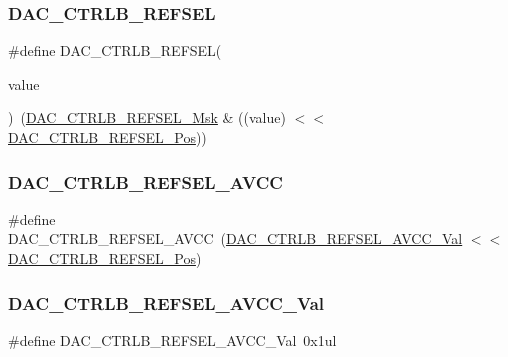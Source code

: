 \subsubsection{\texorpdfstring{DAC\_CTRLB\_REFSEL}{DAC\_CTRLB\_REFSEL}}
{\footnotesize\ttfamily \#define D\+A\+C\+\_\+\+C\+T\+R\+L\+B\+\_\+\+R\+E\+F\+S\+EL(\begin{DoxyParamCaption}\item[{}]{value }\end{DoxyParamCaption})~(\mbox{\hyperlink{group___s_a_m_d21___d_a_c_ga257979650aa6e806ad98f4095f58dd52}{D\+A\+C\+\_\+\+C\+T\+R\+L\+B\+\_\+\+R\+E\+F\+S\+E\+L\+\_\+\+Msk}} \& ((value) $<$$<$ \mbox{\hyperlink{group___s_a_m_d21___d_a_c_gace1da3ee1cda6efe12a220080a718b99}{D\+A\+C\+\_\+\+C\+T\+R\+L\+B\+\_\+\+R\+E\+F\+S\+E\+L\+\_\+\+Pos}}))}

\mbox{\label{group___s_a_m_d21___d_a_c_ga70dc3629848778c513b61220e3a47107}} 
\subsubsection{\texorpdfstring{DAC\_CTRLB\_REFSEL\_AVCC}{DAC\_CTRLB\_REFSEL\_AVCC}}
{\footnotesize\ttfamily \#define D\+A\+C\+\_\+\+C\+T\+R\+L\+B\+\_\+\+R\+E\+F\+S\+E\+L\+\_\+\+A\+V\+CC~(\mbox{\hyperlink{group___s_a_m_d21___d_a_c_ga0ec9e0f724ebc16f883f720380d25771}{D\+A\+C\+\_\+\+C\+T\+R\+L\+B\+\_\+\+R\+E\+F\+S\+E\+L\+\_\+\+A\+V\+C\+C\+\_\+\+Val}}     $<$$<$ \mbox{\hyperlink{group___s_a_m_d21___d_a_c_gace1da3ee1cda6efe12a220080a718b99}{D\+A\+C\+\_\+\+C\+T\+R\+L\+B\+\_\+\+R\+E\+F\+S\+E\+L\+\_\+\+Pos}})}

\mbox{\label{group___s_a_m_d21___d_a_c_ga0ec9e0f724ebc16f883f720380d25771}} 
\subsubsection{\texorpdfstring{DAC\_CTRLB\_REFSEL\_AVCC\_Val}{DAC\_CTRLB\_REFSEL\_AVCC\_Val}}
{\footnotesize\ttfamily \#define D\+A\+C\+\_\+\+C\+T\+R\+L\+B\+\_\+\+R\+E\+F\+S\+E\+L\+\_\+\+A\+V\+C\+C\+\_\+\+Val~0x1ul}



